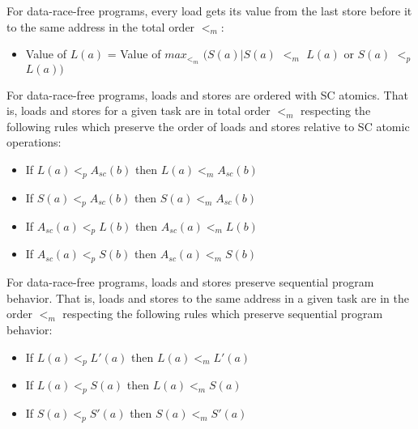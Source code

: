 For data-race-free programs, every load gets its value from the last
store before it to the same address in the total order $<_m$:
\begin{itemize}
  \item Value of $L(a)$ = Value of
        $max_{<_m}$ $( S(a)|S(a)$ $<_m$ $L(a)$ or $S(a)$ $<_p$ $L(a) )$
\end{itemize}

For data-race-free programs, loads and stores are ordered with SC
atomics.  That is, loads and stores for a given task are in total
order $<_m$ respecting the following rules which preserve the order of
loads and stores relative to SC atomic operations:


\begin{itemize}
  \item If $L(a)<_pA_{sc}(b)$ then $L(a)<_mA_{sc}(b)$
  \item If $S(a)<_pA_{sc}(b)$ then $S(a)<_mA_{sc}(b)$
  \item If $A_{sc}(a)<_pL(b)$ then $A_{sc}(a)<_mL(b)$
  \item If $A_{sc}(a)<_pS(b)$ then $A_{sc}(a)<_mS(b)$
\end{itemize}

For data-race-free programs, loads and stores preserve sequential
program behavior.  That is, loads and stores to the same address in a
given task are in the order $<_m$ respecting the following rules which
preserve sequential program behavior:

\begin{itemize}
  \item If $L(a) <_p L'(a)$ then $L(a) <_m L'(a)$
  \item If $L(a) <_p S(a)$ then $L(a) <_m S(a)$
  \item If $S(a) <_p S'(a)$ then $S(a) <_m S'(a)$
\end{itemize}


